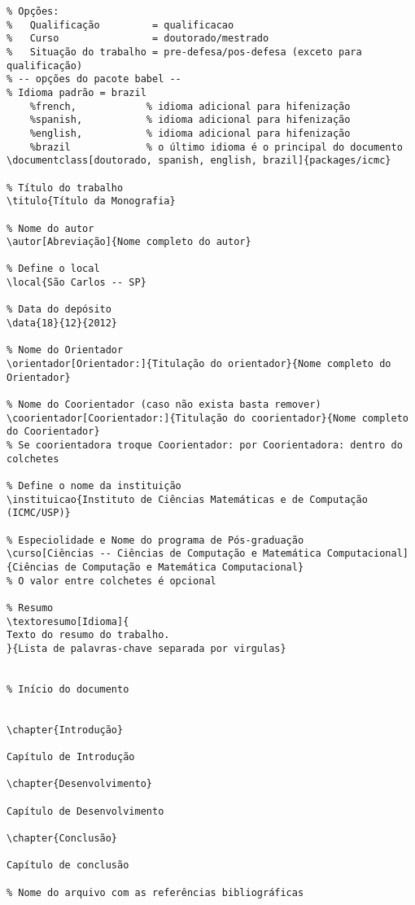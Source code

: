 \lstset{language=Tex, breaklines=true}
\begin{lstlisting}[frame=single]
% Documento utilizando a classe ufgcac
% Opções: 
%   Qualificação         = qualificacao 
%   Curso                = doutorado/mestrado
%   Situação do trabalho = pre-defesa/pos-defesa (exceto para qualificação)
% -- opções do pacote babel --
% Idioma padrão = brazil
	%french,	    	% idioma adicional para hifenização
	%spanish,			% idioma adicional para hifenização
	%english,			% idioma adicional para hifenização
	%brazil				% o último idioma é o principal do documento
\documentclass[doutorado, spanish, english, brazil]{packages/icmc}

% Título do trabalho
\titulo{Título da Monografia}

% Nome do autor
\autor[Abreviação]{Nome completo do autor}

% Define o local
\local{São Carlos -- SP}

% Data do depósito
\data{18}{12}{2012}

% Nome do Orientador
\orientador[Orientador:]{Titulação do orientador}{Nome completo do Orientador}

% Nome do Coorientador (caso não exista basta remover)
\coorientador[Coorientador:]{Titulação do coorientador}{Nome completo do Coorientador}
% Se coorientadora troque Coorientador: por Coorientadora: dentro do colchetes

% Define o nome da instituição
\instituicao{Instituto de Ciências Matemáticas e de Computação (ICMC/USP)}

% Especiolidade e Nome do programa de Pós-graduação
\curso[Ciências -- Ciências de Computação e Matemática Computacional]{Ciências de Computação e Matemática Computacional}
% O valor entre colchetes é opcional

% Resumo
\textoresumo[Idioma]{
Texto do resumo do trabalho.
}{Lista de palavras-chave separada por virgulas}


% Início do documento


\chapter{Introdução}

Capítulo de Introdução

\chapter{Desenvolvimento}

Capítulo de Desenvolvimento

\chapter{Conclusão}

Capítulo de conclusão

% Nome do arquivo com as referências bibliográficas




\end{lstlisting}